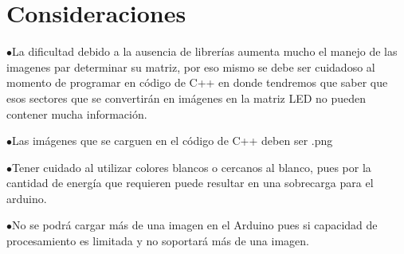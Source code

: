 \documentclass{article}
\begin{document}
\section{Consideraciones} \label{contenido}
$\bullet$La dificultad debido a la ausencia de librerías aumenta mucho el manejo de las imagenes par determinar su matriz, por eso mismo se debe ser cuidadoso al momento de programar en código de C++ en donde tendremos que saber que esos sectores que se convertirán en imágenes en la matriz LED no pueden contener mucha información.

$\bullet$Las imágenes que se carguen en el código de C++ deben ser .png

$\bullet$Tener cuidado al utilizar colores blancos o cercanos al blanco, pues por la cantidad de energía que requieren puede resultar en una sobrecarga para el arduino.

$\bullet$No se podrá cargar más de una imagen en el Arduino pues si capacidad de procesamiento es limitada y no soportará más de una imagen.
\end{document}
